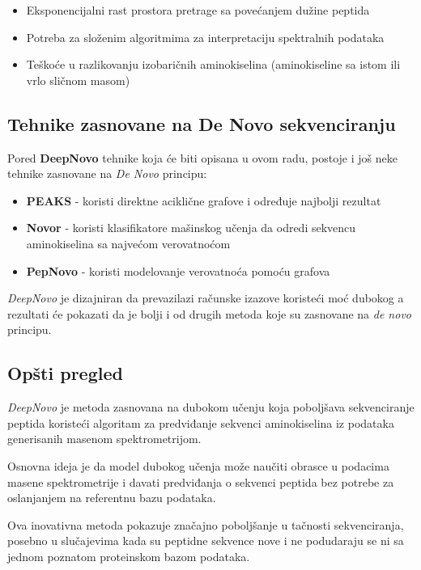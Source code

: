 \documentclass[12pt,oneside]{memoir}
\begin{document}
\begin{itemize}
\item Eksponencijalni rast prostora pretrage sa povećanjem dužine peptida
\item Potreba za složenim algoritmima za interpretaciju spektralnih podataka
\item Teškoće u razlikovanju izobaričnih aminokiselina (aminokiseline sa istom ili vrlo sličnom masom)
\end{itemize}

\subsection{Tehnike zasnovane na De Novo sekvenciranju}
Pored \textbf{DeepNovo} tehnike koja će biti opisana u ovom radu, postoje i još neke tehnike zasnovane na \emph{De Novo} principu:

\begin{itemize}
\item \textbf{PEAKS} \cite{peaks} - koristi direktne aciklične grafove i određuje najbolji rezultat
\item \textbf{Novor} \cite{novor} - koristi klasifikatore mašinskog učenja da odredi sekvencu aminokiselina sa najvećom verovatnoćom
\item \textbf{PepNovo} \cite{pepnovo} - koristi modelovanje verovatnoća pomoću grafova
\end{itemize}

\emph{DeepNovo} je dizajniran da prevazilazi računske izazove koristeći moć dubokog a rezultati će pokazati da je bolji i od drugih metoda koje su zasnovane na \emph{de novo} principu.

\subsection{Opšti pregled}
\emph{DeepNovo} \cite{deepnovo} je metoda zasnovana na dubokom učenju koja poboljšava sekvenciranje peptida koristeći algoritam za predviđanje sekvenci aminokiselina iz podataka generisanih masenom spektrometrijom.

Osnovna ideja je da model dubokog učenja može naučiti obrasce u podacima masene spektrometrije i davati predviđanja o sekvenci peptida bez potrebe za oslanjanjem na referentnu bazu podataka.

Ova inovativna metoda pokazuje značajno poboljšanje u tačnosti sekvenciranja, posebno u slučajevima kada su peptidne sekvence nove i ne podudaraju se ni sa jednom poznatom proteinskom bazom podataka.
\end{document}
